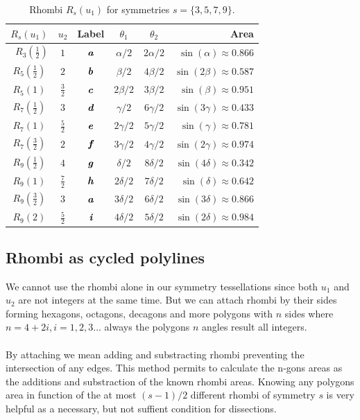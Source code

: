 \documentclass[11pt]{article}
\def\mathbi#1{\textbf{\em #1}}
\begin{document}
\begin{table}[h]
\begin{center}
\begin{tabular}{|c|c|c|c c| r |}
\hline
$R_s(u_1)$ & $u_2$ & Label & $\theta_1$ & $\theta_2$ & Area \\ \hline\
$R_3(\frac{1}2)$ & $1$  & $\mathbi{a}$ & $\alpha/2$ & $2\alpha/2$  & $\sin(\alpha) \approx 0.866$ \\[0.5ex]
\hline
$R_5(\frac{1}2)$ & $2$  & $\mathbi{b}$ & $\beta/2$  & $4\beta/2$   & $\sin(2\beta) \approx 0.587$\\[0.5ex]
$R_5(1)$ & $\frac{3}2$  & $\mathbi{c}$ & $2\beta/2$ & $3\beta/2$   & $\sin(\beta) \approx 0.951$\\[0.5ex]
\hline
$R_7(\frac{1}2)$ & $3$  & $\mathbi{d}$ & $\gamma/2$ & $6\gamma/2$  & $\sin(3\gamma) \approx 0.433$\\[0.5ex]
$R_7(1)$ & $\frac{5}2$ & $\mathbi{e}$ & $2\gamma/2$ & $5\gamma/2$ & $\sin(\gamma) \approx 0.781$\\[0.5ex]
$R_7(\frac{3}2)$ & $2$  & $\mathbi{f}$ & $3\gamma/2$ & $4\gamma/2$ & $\sin(2\gamma) \approx 0.974$\\[0.5ex]
\hline
$R_9(\frac{1}2)$ & $4$ & $\mathbi{g}$ & $\delta/2$ & $8\delta/2$  & $\sin(4\delta) \approx 0.342$\\[0.5ex]
$R_9(1)$ & $\frac{7}2$ & $\mathbi{h}$ & $2\delta/2$ & $7\delta/2$ & $\sin(\delta) \approx 0.642$\\[0.5ex]
$R_9(\frac{3}2)$ & $3$ & $\mathbi{a}$ & $3\delta/2$ & $6\delta/2$ & $\sin(3\delta) \approx 0.866$\\[0.5ex]
$R_9(2)$ & $\frac{5}2$ & $\mathbi{i}$ & $4\delta/2$ & $5\delta/2$ & $\sin(2\delta) \approx 0.984$\\[0.5ex]
\hline
\end{tabular}
\caption{Rhombi $R_s(u_1)$ for symmetries $s=\{3,5,7,9\}$.} 
\label{tbl:rhombi}
\end{center}
\end{table}

\subsection{Rhombi as cycled polylines}

We cannot use the rhombi alone in our symmetry tessellations since both $u_1$ and $u_2$ are not integers at the same time. But we can attach rhombi by their sides forming hexagons, octagons, decagons and more polygons with $n$ sides where $n=4+2i, i=1,2,3...$ always the polygons $n$ angles result all integers.
\\\\
By attaching we mean adding and substracting rhombi preventing the intersection of any edges. This method permits to calculate the n-gons areas as the additions and substraction of the known rhombi areas. Knowing any polygons area in function of the at most $(s-1)/2$ different rhombi of symmetry $s$ is very helpful as a necessary, but not suffient condition for dissections.
\end{document}
